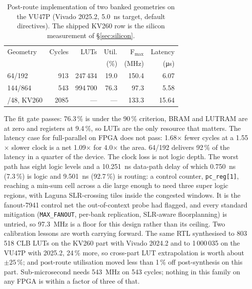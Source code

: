 \begin{table}[t]
  \centering
  \footnotesize
  \caption{Post-route implementation of two banked geometries on the VU47P
    (Vivado 2025.2, \SI{5.0}{\nano\second} target, default directives). The
    shipped KV260 row is the silicon measurement of \S\ref{sec:silicon}.}
  \label{tab:fpga}
  \begin{tabular}{@{}lrrrrr@{}}
    \toprule
    Geometry & Cycles & LUTs & Util. & F$_{\max}$ & Latency \\
             &        &      & (\%)  & (MHz)      & (\si{\micro\second}) \\
    \midrule
    64/192   & 913  & 247\,434 & 19.0 & 150.4 & 6.07 \\
    144/864  & 543  & 994\,700 & 76.3 & 97.3  & 5.58 \\
    \addlinespace
    16/48, KV260 & 2085 & --- & --- & 133.3 & 15.64 \\
    \bottomrule
  \end{tabular}
\end{table}

The fit gate passes: 76.3\,\% is under the 90\,\% criterion, BRAM and LUTRAM
are at zero and registers at 9.4\,\%, so LUTs are the only resource that
matters. The latency case for full-parallel on FPGA does not pass:
1.68$\times$ fewer cycles at a 1.55$\times$ slower clock is a net 1.09$\times$
for 4.0$\times$ the area. 64/192 delivers 92\,\% of the latency in a quarter of
the device.
The clock loss is not logic depth. The worst path has eight logic levels and a
\SI{10.251}{\nano\second} data-path delay of which \SI{0.750}{\nano\second}
(7.3\,\%) is logic and \SI{9.501}{\nano\second} (92.7\,\%) is routing: a
control counter, \texttt{pc\_reg[1]}, reaching a min-sum cell across a die large
enough to need three super logic regions, with Laguna SLR-crossing tiles inside
the congested windows. It is the fanout-7941 control net the out-of-context
probe had flagged, and every standard mitigation (\texttt{MAX\_FANOUT}, per-bank
replication, SLR-aware floorplanning) is untried, so \SI{97.3}{\mega\hertz} is
a floor for this design rather than its ceiling.
Two calibration lessons are worth carrying forward. The same RTL synthesised to
803\,518 CLB LUTs on the KV260 part with Vivado 2024.2 and to 1\,000\,035 on the
VU47P with 2025.2, 24\,\% more, so cross-part LUT extrapolation is worth about
$\pm25\,\%$; and post-route utilisation moved less than 1\,\% off
post-synthesis on this part.
Sub-microsecond needs \SI{543}{\mega\hertz} on 543 cycles; nothing in this
family on any FPGA is within a factor of three of that.

